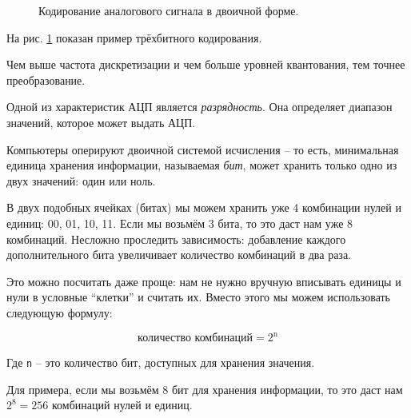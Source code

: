 \documentclass[../sparc.tex]{subfiles}
\begin{document}
\begin{enumerate}
\begin{figure}[h]
    \caption{Кодирование аналогового сигнала в двоичной форме.}
    \label{fig:encoding}
  \end{figure}

  На рис. \ref{fig:encoding} показан пример трёхбитного кодирования.

  Чем выше частота дискретизации и чем больше уровней квантования, тем точнее
  преобразование.

\end{enumerate}

Одной из характеристик АЦП является \emph{разрядность}.  Она определяет диапазон
значений, которое может выдать АЦП.

Компьютеры оперируют двоичной системой исчисления -- то есть, минимальная единица
хранения информации, называемая \emph{бит}, может хранить только одно из двух
значений: один или ноль.

В двух подобных ячейках (битах) мы можем хранить уже 4 комбинации нулей и
единиц: 00, 01, 10, 11.  Если мы возьмём 3 бита, то это даст нам уже 8
комбинаций.  Несложно проследить зависимость: добавление каждого дополнительного
бита увеличивает количество комбинаций в два раза.

Это можно посчитать даже проще: нам не нужно вручную вписывать единицы и нули в
условные ``клетки'' и считать их.  Вместо этого мы можем использовать следующую
формулу:

\begin{equation}
  \mbox{количество комбинаций} = 2^{\mbox{n}}
\end{equation}

Где \texttt{n} -- это количество бит, доступных для хранения значения.

Для примера, если мы возьмём 8 бит для хранения информации, то это даст нам $2^8
= 256$ комбинаций нулей и единиц.
\end{document}
